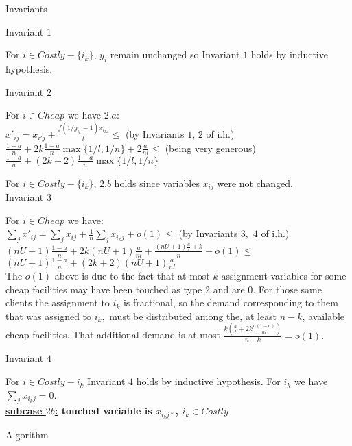 \documentclass[11pt]{article}\usepackage{amsmath}
\begin{document}
{\sc Invariants}

{\sf Invariant $1$}

For $i \in Costly-\{i_k\}$, $y_i$ remain unchanged so Invariant $1$ holds by inductive hypothesis.

{\sf Invariant $2$}

For $i \in Cheap$ we have $2.a$:\\

\noindent
$x'_{ij}=x_{i'j}+\frac{f(1/y_{i_k}-1)x_{i_kj}}{t}\leq$ \hfill (by Invariants $1$, $2$ of i.h.)\\
$\frac{1-a}{n}+2k\frac{1-a}{n}\max \{1/l,1/n \}+2\frac{a}{nl}\leq$ \hfill (being very generous)\\
$\frac{1-a}{n}+(2k+2)\frac{1-a}{n}\max \{1/l,1/n \}$  


For $i \in Costly-\{i_k\}$, $2.b$ holds since variables $x_{ij}$ were
not changed. \\


{\sf Invariant $3$}

For $i \in Cheap$ we have:\\

\noindent
$\sum_j x'_{ij}=\sum_j x_{ij} + \frac{1}{n}\sum_{j}x_{i_kj} +o(1)\leq$ \hfill (by Invariants $3,$ $4$ of i.h.)\\
$(nU+1)\frac{1-a}{n}+2k(nU+1)\frac{a}{nl} +\frac{(nU+1)\frac{a}{l}+k}{n}+o(1)\leq$\\
$(nU+1)\frac{1-a}{n}+(2k+2)(nU+1)\frac{a}{nl}$\\

The $o(1)$ above is due to the fact that at most $k$ assignment variables
 for some cheap facilities may have been touched as type $2$ and are $0.$ 
For  those same clients the assignment to $i_k$ is fractional,
 so the demand
corresponding to them  that was assigned to  $i_k,$  must be 
distributed among the, at least $n-k$, available
cheap facilities. That additional demand is 
at most $\frac{k (\frac{a}{l}+2k\frac{a(1-a)}{nl})}{n-k} = o(1).$

{\sf Invariant $4$}

For $i \in Costly-{i_k}$ Invariant $4$ holds by inductive hypothesis. For $i_k$ we have $\sum_j x_{i_kj}=0$.\\





\medskip
\noindent
{\bf \underline{subcase $2b$:} touched variable is  $x_{i_kj*}$, $i_k \in Costly$}

{\sc Algorithm}
\end{document}
